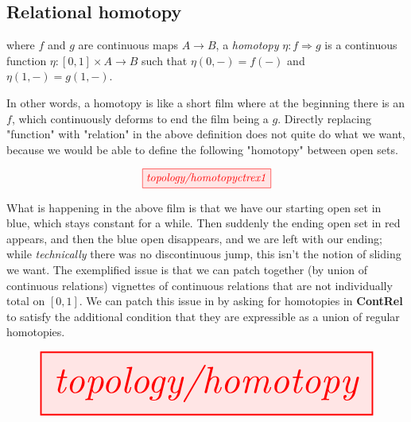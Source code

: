 \clearpage

\subsection{Relational homotopy}

\begin{defn}
where $f$ and $g$ are continuous maps $A \rightarrow B$, a \emph{homotopy} $\eta : f \Rightarrow g$ is a continuous function $\eta : [0,1] \times A \rightarrow B$ such that $\eta(0,-) = f(-)$ and $\eta(1,-) = g(1,-)$.
\end{defn}

In other words, a homotopy is like a short film where at the beginning there is an $f$, which continuously deforms to end the film being a $g$. Directly replacing "function" with "relation" in the above definition does not quite do what we want, because we would be able to define the following "homotopy" between open sets.

\[\tikzfig{topology/homotopyctrex1}\]

What is happening in the above film is that we have our starting open set in blue, which stays constant for a while. Then suddenly the ending open set in red appears, and then the blue open disappears, and we are left with our ending; while \emph{technically} there was no discontinuous jump, this isn't the notion of sliding we want. The exemplified issue is that we can patch together (by union of continuous relations) vignettes of continuous relations that are not individually total on $[0,1]$. We can patch this issue in by asking for homotopies in \textbf{ContRel} to satisfy the additional condition that they are expressible as a union of regular homotopies.

\clearpage

\begin{defn}\label{defn:homotopy}
\[\resizebox{\textwidth}{!}{\tikzfig{topology/homotopy}}\]
\end{defn}

